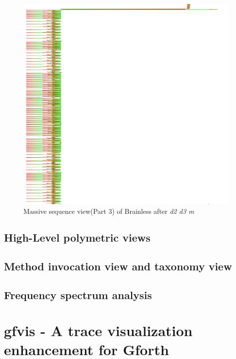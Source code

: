 \begin{figure}[p]
    \centering
    \includegraphics[scale=0.52]{graphics/massive_sequence_view-dir_file_word_3.png}
    \caption{Massive sequence view(Part 3) of Brainless after \emph{d2 d3 m}}
    \label{fig:massive_sequence_view_3}
\end{figure}

\subsection*{High-Level polymetric views}

\subsection*{Method invocation view and taxonomy view}

\subsection*{Frequency spectrum analysis}

\section{gfvis - A trace visualization enhancement for Gforth}

